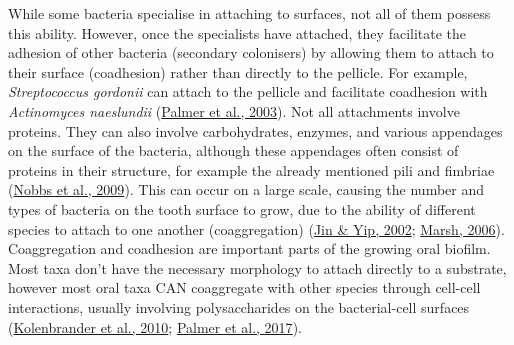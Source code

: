 \documentclass[
  b5paper,
]{book}
\begin{document}
While some bacteria specialise in attaching to surfaces, not all of them
possess this ability. However, once the specialists have attached, they
facilitate the adhesion of other bacteria (secondary colonisers) by
allowing them to attach to their surface (coadhesion) rather than
directly to the pellicle. For example, \emph{Streptococcus gordonii} can
attach to the pellicle and facilitate coadhesion with \emph{Actinomyces
naeslundii}
(\protect\hyperlink{ref-palmerCoaggregationInteractions2003}{Palmer et
al., 2003}). Not all attachments involve proteins. They can also involve
carbohydrates, enzymes, and various appendages on the surface of the
bacteria, although these appendages often consist of proteins in their
structure, for example the already mentioned pili and fimbriae
(\protect\hyperlink{ref-nobbsStreptococcusAdherence2009}{Nobbs et al.,
2009}). This can occur on a large scale, causing the number and types of
bacteria on the tooth surface to grow, due to the ability of different
species to attach to one another (coaggregation)
(\protect\hyperlink{ref-jinSupragingivalCalculus2002}{Jin \& Yip, 2002};
\protect\hyperlink{ref-marshDentalPlaque2006}{Marsh, 2006}).
Coaggregation and coadhesion are important parts of the growing oral
biofilm. Most taxa don't have the necessary morphology to attach
directly to a substrate, however most oral taxa CAN coaggregate with
other species through cell-cell interactions, usually involving
polysaccharides on the bacterial-cell surfaces
(\protect\hyperlink{ref-kolenbranderOralMultispecies2010}{Kolenbrander
et al., 2010};
\protect\hyperlink{ref-palmerInterbacterialAdhesion2017}{Palmer et al.,
2017}).
\end{document}
